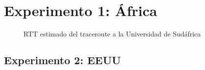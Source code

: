 \newpage
\section{Experimento 1: África}


\begin{landscape}

\end{landscape}

\begin{figure}[H]
  \centering
  \caption{RTT estimado del traceroute a la Universidad de Sudáfrica}
  \label{africaTTL}
\end{figure}

\newpage
\subsection{Experimento 2: EEUU}

\begin{landscape}

\end{landscape}

